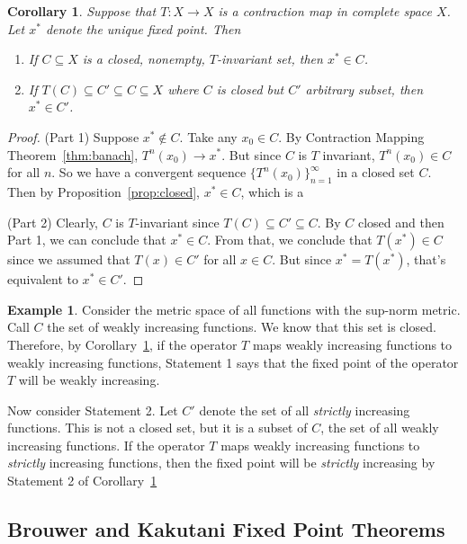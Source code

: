 \documentclass[12pt]{book}
\numberwithin{equation}{section} %
\theoremstyle{plain}
\newtheorem{cor}[thm]{Corollary}
\theoremstyle{definition}
\newtheorem{ex}[thm]{Example}
\theoremstyle{remark}
\newcommand{\ra}{\rightarrow}
\newcommand{\ninf}{_{n=1}^\infty}
\begin{document}
\begin{cor}
\label{cor:cmt}
Suppose that $T: X\rightarrow X$ is a contraction map in complete space
$X$. Let $x^*$ denote the unique fixed point. Then
\begin{enumerate}
  \item If $C\subseteq X$ is a closed, nonempty, $T$-invariant set, then
    $x^* \in C$.
  \item If $T(C)\subseteq C' \subseteq C \subseteq X$ where $C$ is
    closed but $C'$ arbitrary subset, then $x^* \in C'$.
\end{enumerate}
\end{cor}
\begin{proof}
(Part 1)
Suppose $x^*\not\in C$. Take any $x_0\in C$. By Contraction Mapping
Theorem~\ref{thm:banach}, $T^n(x_0)\ra x^*$. But since $C$ is $T$
invariant, $T^n(x_0)\in C$ for all $n$. So we have a convergent
sequence $\{T^n(x_0)\}\ninf$ in a closed set $C$.
Then by Proposition~\ref{prop:closed}, $x^*\in C$, which is a

(Part 2) Clearly, $C$ is $T$-invariant since
$T(C)\subseteq C' \subseteq C$. By $C$ closed and then Part 1, we can
conclude that $x^*\in C$.
From that, we conclude that $T(x^*)\in C$ since we assumed that $T(x)
\in C'$ for all $x \in C$. But since $x^*=T(x^*)$, that's equivalent to
$x^*\in C'$.
\end{proof}

\begin{ex}
Consider the metric space of all functions with the sup-norm metric.
Call $C$ the set of weakly increasing functions. We know that this set
is closed. Therefore, by Corollary~\ref{cor:cmt}, if the operator $T$
maps weakly increasing functions to weakly increasing functions,
Statement 1 says that the fixed point of the operator $T$ will be weakly
increasing.

Now consider Statement 2. Let $C'$ denote the set of all \emph{strictly}
increasing functions. This is not a closed set, but it is a subset of
$C$, the set of all weakly increasing functions. If the operator $T$
maps weakly increasing functions to \emph{strictly} increasing
functions, then the fixed point will be \emph{strictly} increasing by
Statement 2 of Corollary~\ref{cor:cmt}
\end{ex}

\clearpage
\subsection{Brouwer and Kakutani Fixed Point Theorems}
\end{document}
